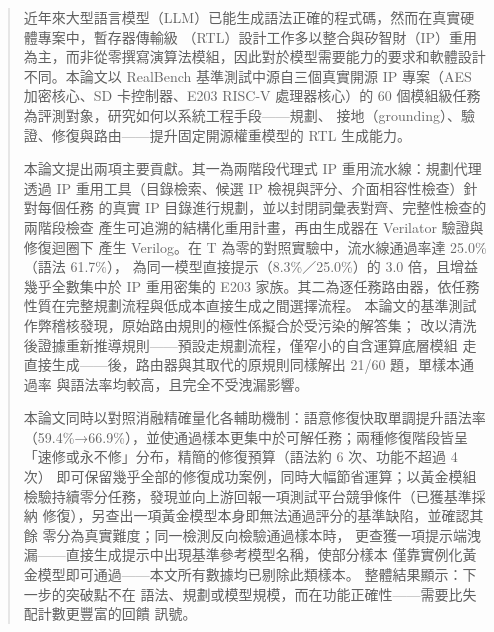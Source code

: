 
\begin{abstract}

近年來大型語言模型（LLM）已能生成語法正確的程式碼，然而在真實硬體專案中，暫存器傳輸級
（RTL）設計工作多以整合與矽智財（IP）重用為主，而非從零撰寫演算法模組，因此對於模型需要能力的要求和軟體設計不同。本論文以
RealBench 基準測試中源自三個真實開源 IP 專案（AES 加密核心、SD 卡控制器、E203
RISC-V 處理器核心）的 60 個模組級任務為評測對象，研究如何以系統工程手段——規劃、
接地（grounding）、驗證、修復與路由——提升固定開源權重模型的 RTL 生成能力。

本論文提出兩項主要貢獻。其一為兩階段代理式 IP 重用流水線：規劃代理透過
IP 重用工具（目錄檢索、候選 IP 檢視與評分、介面相容性檢查）針對每個任務
的真實 IP 目錄進行規劃，並以封閉詞彙表對齊、完整性檢查的兩階段檢查
產生可追溯的結構化重用計畫，再由生成器在 Verilator 驗證與修復迴圈下
產生 Verilog。在 T 為零的對照實驗中，流水線通過率達 25.0\%（語法 61.7\%），
為同一模型直接提示（8.3\%／25.0\%）的 3.0 倍，且增益幾乎全數集中於 IP 重用密集的
E203 家族。其二為逐任務路由器，依任務性質在完整規劃流程與低成本直接生成之間選擇流程。
本論文的基準測試作弊稽核發現，原始路由規則的極性係擬合於受污染的解答集；
改以清洗後證據重新推導規則——預設走規劃流程，僅窄小的自含運算底層模組
走直接生成——後，路由器與其取代的原規則同樣解出 21/60 題，單樣本通過率
與語法率均較高，且完全不受洩漏影響。

本論文同時以對照消融精確量化各輔助機制：語意修復快取單調提升語法率
（59.4\%→66.9\%），並使通過樣本更集中於可解任務；兩種修復階段皆呈
「速修或永不修」分布，精簡的修復預算（語法約 6 次、功能不超過 4 次）
即可保留幾乎全部的修復成功案例，同時大幅節省運算；以黃金模組
檢驗持續零分任務，發現並向上游回報一項測試平台競爭條件（已獲基準採納
修復），另查出一項黃金模型本身即無法通過評分的基準缺陷，並確認其餘
零分為真實難度；同一檢測反向檢驗通過樣本時，
更查獲一項提示端洩漏——直接生成提示中出現基準參考模型名稱，使部分樣本
僅靠實例化黃金模型即可通過——本文所有數據均已剔除此類樣本。
整體結果顯示：下一步的突破點不在
語法、規劃或模型規模，而在功能正確性——需要比失配計數更豐富的回饋
訊號。

\end{abstract}

